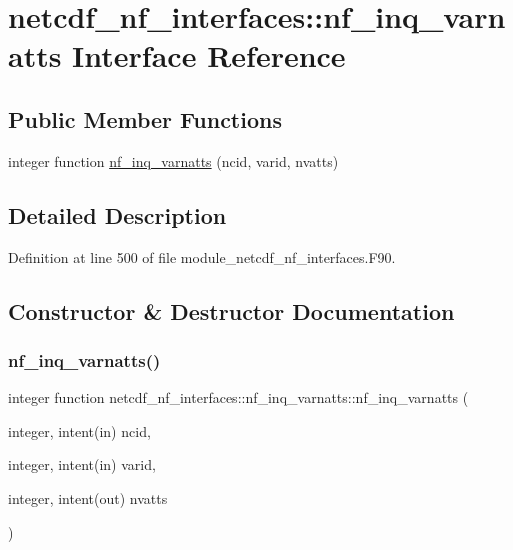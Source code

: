 \hypertarget{interfacenetcdf__nf__interfaces_1_1nf__inq__varnatts}{}\section{netcdf\+\_\+nf\+\_\+interfaces\+:\+:nf\+\_\+inq\+\_\+varnatts Interface Reference}
\label{interfacenetcdf__nf__interfaces_1_1nf__inq__varnatts}
\subsection*{Public Member Functions}
\begin{DoxyCompactItemize}
\item 
integer function \hyperlink{interfacenetcdf__nf__interfaces_1_1nf__inq__varnatts_ab0b219a18994f57f0a51b5e35d9f265f}{nf\+\_\+inq\+\_\+varnatts} (ncid, varid, nvatts)
\end{DoxyCompactItemize}


\subsection{Detailed Description}


Definition at line 500 of file module\+\_\+netcdf\+\_\+nf\+\_\+interfaces.\+F90.



\subsection{Constructor \& Destructor Documentation}
\mbox{\label{interfacenetcdf__nf__interfaces_1_1nf__inq__varnatts_ab0b219a18994f57f0a51b5e35d9f265f}} 
\subsubsection{\texorpdfstring{nf\+\_\+inq\+\_\+varnatts()}{nf\_inq\_varnatts()}}
{\footnotesize\ttfamily integer function netcdf\+\_\+nf\+\_\+interfaces\+::nf\+\_\+inq\+\_\+varnatts\+::nf\+\_\+inq\+\_\+varnatts (\begin{DoxyParamCaption}\item[{integer, intent(in)}]{ncid,  }\item[{integer, intent(in)}]{varid,  }\item[{integer, intent(out)}]{nvatts }\end{DoxyParamCaption})}




